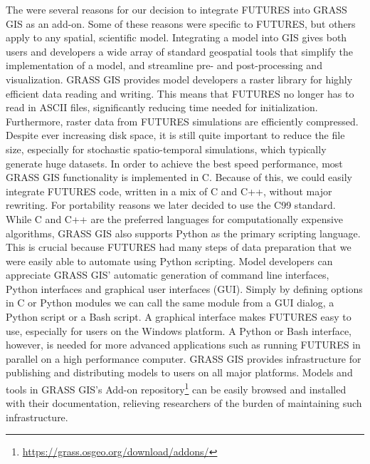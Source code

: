 \documentclass{isprs}
\begin{document}
The were several reasons for our decision to integrate FUTURES into GRASS GIS as an add-on. Some of these reasons were specific to FUTURES, but others apply to any spatial, scientific model.
Integrating a model into GIS gives both users and developers
a wide array of standard geospatial tools that simplify the implementation of a model,
and streamline pre- and post-processing and visualization.
%
GRASS GIS provides
model developers
a raster library for highly efficient data reading and writing.
This means that FUTURES no longer has to read in ASCII files,
significantly reducing time needed for initialization.
Furthermore, raster data from FUTURES simulations are efficiently compressed.
Despite ever increasing disk space, it is still quite important to reduce the file size, especially for
stochastic spatio-temporal simulations, which typically generate huge datasets.
In order to achieve the best speed performance,
most GRASS GIS functionality is implemented in C.
Because of this, we could easily integrate FUTURES 
code, written in a mix of C and C++, 
without major rewriting. 
For portability reasons we later decided to use the C99 standard.
While C and C++ are the preferred languages for computationally expensive algorithms,
GRASS GIS also supports Python as the primary scripting language. 
This is crucial because FUTURES had many steps of data preparation that we were easily able to automate using Python scripting. 
%
Model developers can appreciate
GRASS GIS' automatic generation of
command line interfaces, Python interfaces and graphical user interfaces (GUI).
%
Simply by defining
options in C or Python modules
we can call the same module from a GUI dialog, a Python script or a Bash script.
A graphical interface makes FUTURES easy to use,
especially for users on the Windows platform. 
A Python or Bash interface, however, is needed for more advanced applications such as running FUTURES in parallel on a high performance computer.
GRASS GIS provides infrastructure for publishing and distributing models to users on all major platforms.
Models and tools in GRASS GIS's Add-on repository\footnote{\url{https://grass.osgeo.org/download/addons/}}
can be easily browsed and installed with their documentation,
relieving researchers 
of the burden of maintaining 
such
infrastructure.
\end{document}
